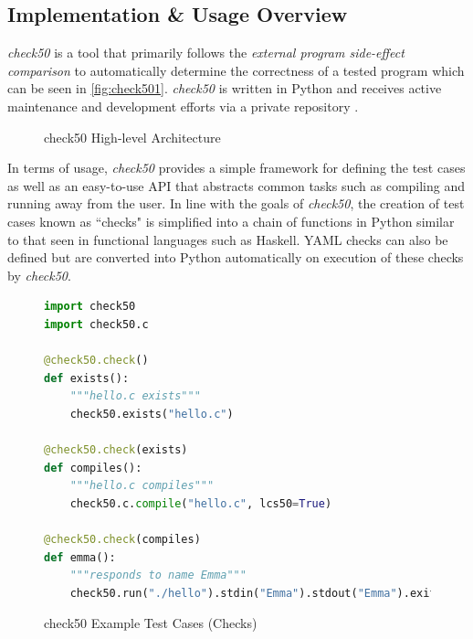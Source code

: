 \documentclass[hidelinks]{report}
\begin{document}
\subsection{Implementation \& Usage Overview}

\textit{check50} is a tool that primarily follows the \textit{external program side-effect comparison} to automatically determine the correctness of a tested program which can be seen in \autoref{fig:check501}. \textit{check50} is written in Python and receives active maintenance and development efforts via a private repository \cite{check50Github}.

\begin{figure}[h]
	\centering
	\caption{check50 High-level Architecture}
	\label{fig:check501}
\end{figure}

In terms of usage, \textit{check50} provides a simple framework for defining the test cases as well as an easy-to-use API that abstracts common tasks such as compiling and running away from the user. In line with the goals of \textit{check50}, the creation of test cases known as ``checks" is simplified into a chain of functions in Python similar to that seen in functional languages such as Haskell. YAML checks can also be defined but are converted into Python automatically on execution of these checks by \textit{check50}.

\begin{figure}[h]
	\centering
	\begin{lstlisting}[language=python, breaklines=true, linewidth=\linewidth, tabsize=4]
import check50
import check50.c

@check50.check()
def exists():
	"""hello.c exists"""
	check50.exists("hello.c")

@check50.check(exists)
def compiles():
	"""hello.c compiles"""
	check50.c.compile("hello.c", lcs50=True)

@check50.check(compiles)
def emma():
	"""responds to name Emma"""
	check50.run("./hello").stdin("Emma").stdout("Emma").exit()
	\end{lstlisting}
	\caption{check50 Example Test Cases (Checks)}
	\label{fig:check502}
\end{figure}
\end{document}
